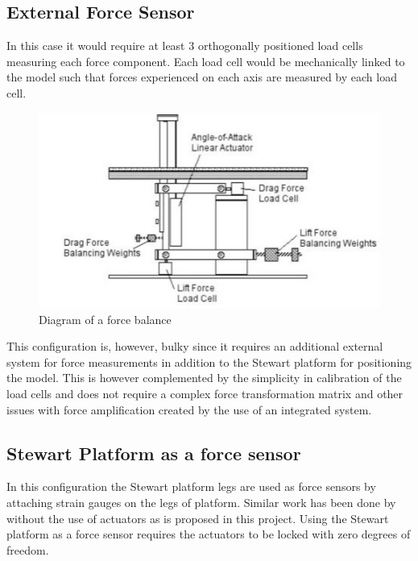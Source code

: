 \subsection{External Force Sensor}
In this case it would require at least 3 orthogonally positioned load cells measuring each force component. Each load cell would be mechanically linked to the model such that forces experienced on each axis are measured by each load cell. 
\begin{center}
	\begin{figure}[H]
		\centering
		\includegraphics{Figures/modBal}
		\caption[Diagram of a force balance]{Diagram of a force balance \cite{post_force_2010}}
	\end{figure}
\end{center}
This configuration is, however, bulky since it requires an additional external system for force measurements in addition to the Stewart platform for positioning the model. This is however complemented by the simplicity in calibration of the load cells and does not require a complex force transformation matrix and other issues with force amplification created by the use of an integrated system.
\subsection{Stewart Platform as a force sensor}
In this configuration the Stewart platform legs are used as force sensors by attaching strain gauges on the legs of platform. Similar work has been done by \cite{ferreira2015design} without the use of actuators as is proposed in this project. Using the Stewart platform as a force sensor requires the actuators to be locked with zero degrees of freedom.

